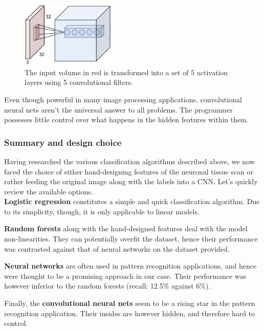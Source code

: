 \documentclass[a4paper, 11pt]{article}
\numberwithin{equation}{section}
\begin{document}
		\begin{figure}[!h]
			\centering
			\includegraphics[page=1,width=0.40\textwidth]{depthcol.jpeg}
			\caption{\label{fig:conv_net}{The input volume in red is transformed into a set of 5 activation layers using 5 convolutional filters.\cite{stanford2016convnets}}}
		\end{figure}
		
		\noindent Even though powerful in many image processing applications, convolutional neural nets aren't the universal answer to all problems. The programmer possesses little control over what happens in the hidden features within them.
		
		\subsubsection{Summary and design choice}
		Having researched the various classification algorithms described above, we now faced the choice of either hand-designing features of the neuronal tissue scan or rather feeding the original image along with the labels into a CNN. Let's quickly review the available options. \\
		
		\noindent \textbf{Logistic regression} constitutes a simple and quick classification algorithm. Due to its simplicity, though, it is only applicable to linear models.
		
		\noindent \textbf{Random forests} along with the hand-designed features deal with the model non-linearities. They can potentially overfit the dataset, hence their performance was contrasted against that of neural networks on the dataset provided.
		
		\noindent \textbf{Neural networks} are often used in pattern recognition applications, and hence were thought to be a promising approach in our case. Their performance was however inferior to the random forests (recall: 12.5\% against 6\%).
		
		\noindent Finally, the \textbf{convolutional neural nets} seem to be a rising star in the pattern recognition application. Their insides are however hidden, and therefore hard to control. \\
		
\end{document}
